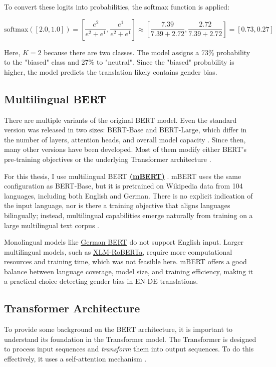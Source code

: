 To convert these logits into probabilities, the softmax function is applied:

\[
\text{softmax}([2.0, 1.0]) = \left[\frac{e^2}{e^2 + e^1}, \frac{e^1}{e^2 + e^1}\right] \approx \left[\frac{7.39}{7.39 + 2.72}, \frac{2.72}{7.39 + 2.72}\right] = [0.73, 0.27]
\]

Here, \(K=2\) because there are two classes. The model assigns a 73\% probability to the "biased" class and 27\% to "neutral". Since the "biased" probability is higher, the model predicts the translation likely contains gender bias.

\subsection{Multilingual BERT}
    There are multiple variants of the original BERT model. Even the standard version was released in two sizes: BERT-Base and BERT-Large, which differ in the number of layers, attention heads, and overall model capacity \citep{devlinBERTPretrainingDeep2019}. Since then, many other versions have been developed. Most of them modify either BERT’s pre-training objectives or the underlying Transformer architecture \citep{libovickyHowLanguageNeutralMultilingual2019}.

    For this thesis, I use multilingual BERT \textbf{\href{https://huggingface.co/google-bert/bert-base-multilingual-cased}{(mBERT)}} \citep{devlinBERTPretrainingDeep2019}. mBERT uses the same configuration as BERT-Base, but it is pretrained on Wikipedia data from 104 languages, including both English and German. There is no explicit indication of the input language, nor is there a training objective that aligns languages bilingually; instead, multilingual capabilities emerge naturally from training on a large multilingual text corpus \citep{piresHowMultilingualMultilingual2019}.

    Monolingual models like \href{https://huggingface.co/google-bert/bert-base-german-cased}{German BERT} do not support English input. Larger multilingual models, such as \href{https://huggingface.co/docs/transformers/en/model_doc/xlm-roberta}{XLM-RoBERTa}, require more computational resources and training time, which was not feasible here. mBERT offers a good balance between language coverage, model size, and training efficiency, making it a practical choice detecting gender bias in EN-DE translations.

\subsection{Transformer Architecture} \label{subsection:transformer_arch}
  To provide some background on the BERT architecture, it is important to understand its foundation in the Transformer model. The Transformer is designed to process input sequences and \textit{transform} them into output sequences. To do this effectively, it uses a self-attention mechanism \citep{phuongFormalAlgorithmsTransformers2022}.

